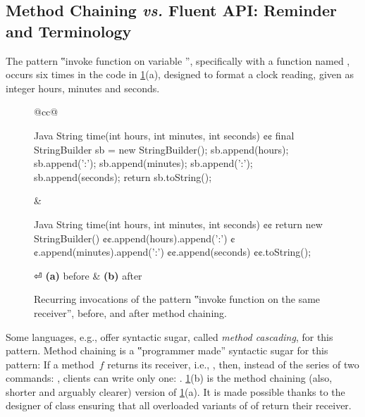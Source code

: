\subsection{Method Chaining \emph{vs.} Fluent API: Reminder and Terminology}
The pattern ‟invoke function on variable ”, specifically with
  a function named , occurs
six times in the code in \cref{Figure:chaining}(a), designed
  to format a clock reading, given as integer hours, minutes and
  seconds.

\begin{figure}[H]
  \caption{\label{Figure:chaining}%
    Recurring invocations of the pattern ‟invoke function on the same
      receiver”, before, and after method chaining.
  }%
    \begin{tabular}{@{}cc@{}}%
  \begin{lcode}[minipage,width=44ex,box align=center]{Java}
String time(int hours, int minutes, int seconds) {¢¢
  final StringBuilder sb = new StringBuilder();
  sb.append(hours);
  sb.append(':');
  sb.append(minutes);
  sb.append(':');
  sb.append(seconds);
  return sb.toString();
}\end{lcode}
\hfill
&
\hspace{1ex}
  \begin{lcode}[minipage,width=44ex,box align=center]{Java}
String time(int hours, int minutes, int seconds) {¢¢
    return new StringBuilder()
      ¢¢.append(hours).append(':')
      ¢¢.append(minutes).append(':')
      ¢¢.append(seconds)
      ¢¢.toString();
}\end{lcode}
⏎
\textbf{(a)} before & \textbf{(b)} after
\end{tabular}
\end{figure}

Some languages, e.g., \Smalltalk offer syntactic sugar, called \emph{method cascading}, for this pattern.
Method chaining is a ‟programmer made” syntactic sugar for this pattern:
  If a method~$f$ returns its receiver, i.e., ,
  then, instead of the series of two commands: \mbox{}, clients can write
  only one: \mbox{}.
  \cref{Figure:chaining}(b) is the method chaining
  (also, shorter and arguably clearer) version of
  \cref{Figure:chaining}(a).
It is made possible thanks to the designer of class  ensuring that all overloaded variants of
  of  return their receiver.

